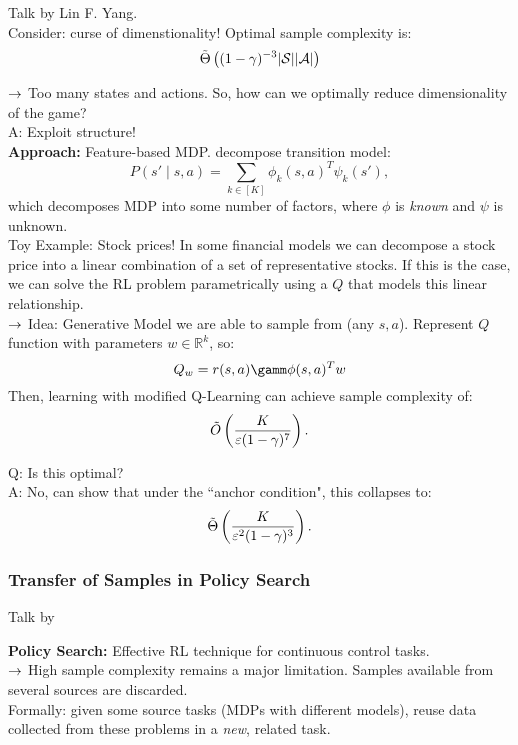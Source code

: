 Talk by Lin F. Yang. \\

Consider: curse of dimenstionality! Optimal sample complexity is:
\[
\tilde{\Theta}\left((1-\gamma)^{-3}|\mathcal{S}||\mathcal{A}|\right)
\]

$\rightarrow$ Too many states and actions. So, how can we optimally reduce dimensionality of the game?\\

A: Exploit structure! \\

{\bf Approach:} Feature-based MDP. decompose transition model:
\[
P(s' \mid s,a) = \sum_{k \in [K]} \phi_k(s,a)^T \psi_k(s'),
\]
which decomposes MDP into some number of factors, where $\phi$ is {\it known} and $\psi$ is unknown. \\

Toy Example: Stock prices! In some financial models we can decompose a stock price into a linear combination of a set of representative stocks. If this is the case, we can solve the RL problem parametrically using a $Q$ that models this linear relationship. \\

$\rightarrow$ Idea: Generative Model we are able to sample from (any $s,a$). Represent $Q$ function with parameters $w \in \mathbb{R}^k$, so:
\[
Q_w = r(s,a) \gamm \phi(s,a)^T w
\]
Then, learning with modified Q-Learning can achieve sample complexity of:
\[
\tilde{O}\left(\frac{K}{\varepsilon(1-\gamma)^7}\right).
\]

Q: Is this optimal? \\

A: No, can show that under the ``anchor condition", this collapses to:
\[
\tilde{\Theta}\left(\frac{K}{\varepsilon^2(1-\gamma)^3}\right).
\]

\spacerule

\subsubsection{Transfer of Samples in Policy Search}

Talk by

{\bf Policy Search:} Effective RL technique for continuous control tasks. \\

$\rightarrow$ High sample complexity remains a major limitation. Samples available from several sources are discarded. \\

Formally: given some source tasks (MDPs with different models), reuse data collected from these problems in a {\it new}, related task. \\

